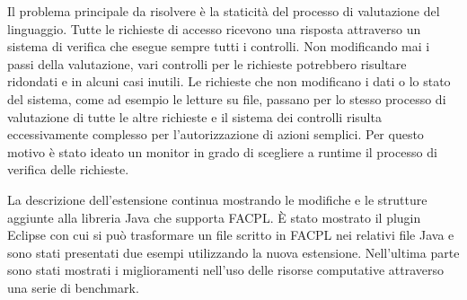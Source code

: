 \documentclass[10pt]{article}
\begin{document}
Il problema principale da risolvere è la staticità del processo di valutazione del linguaggio.
Tutte le richieste di accesso ricevono una risposta attraverso un sistema di verifica che esegue sempre
tutti i controlli. Non modificando mai i passi della valutazione, vari controlli per le richieste potrebbero
risultare ridondati e in alcuni casi inutili. Le richieste che non modificano i dati
o lo stato del sistema, come ad esempio le letture su file, passano per lo stesso processo di valutazione
di tutte le altre richieste e il sistema dei controlli risulta eccessivamente complesso per l'autorizzazione di azioni semplici.
Per questo motivo è stato ideato un monitor in grado di scegliere a runtime il processo di verifica delle richieste.\par

La descrizione dell'estensione continua mostrando le modifiche e le strutture aggiunte alla libreria Java che supporta
FACPL. \MakeUppercase{è} stato mostrato il plugin Eclipse con cui si può trasformare un file scritto in FACPL nei
relativi file Java e sono stati presentati due esempi utilizzando la nuova estensione. Nell'ultima parte
sono stati mostrati i miglioramenti nell'uso delle risorse computative attraverso una serie di benchmark.
\end{document}

